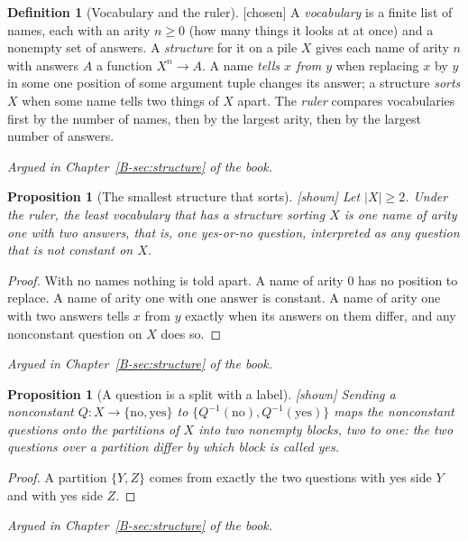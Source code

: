 \documentclass[11pt, a4paper]{article}
\theoremstyle{plain}
\newtheorem{proposition}[theorem]{Proposition}
\theoremstyle{definition}
\newtheorem{definition}[theorem]{Definition}
\theoremstyle{remark}
\newcommand{\Bool}{\{\mathrm{no},\mathrm{yes}\}}
\newcommand{\inv}{^{-1}}
\newcommand{\argued}[1]{\par\noindent\textit{Argued in Chapter~\ref{B-#1} of the book.}\par}
\newcommand{\kind}[1]{\textup{[#1]}}
\begin{document}
\begin{definition}[Vocabulary and the ruler]\label{spec:ruler} \kind{chosen}
A \emph{vocabulary} is a finite list of names, each with an arity $n\ge 0$ (how many things it looks at at
once) and a nonempty set of answers. A \emph{structure} for it on a pile $X$ gives each name of arity $n$
with answers $A$ a function $X^n\to A$. A name \emph{tells $x$ from $y$} when replacing $x$ by $y$ in some one
position of some argument tuple changes its answer; a structure \emph{sorts} $X$ when some name tells two
things of $X$ apart. The \emph{ruler} compares vocabularies first by the number of names, then by the largest
arity, then by the largest number of answers.
\end{definition}
\argued{sec:structure}

\begin{proposition}[The smallest structure that sorts]\label{spec:one-question} \kind{shown}
Let $|X|\ge2$. Under the ruler, the least vocabulary that has a structure sorting $X$ is one name of arity
one with two answers, that is, one yes-or-no question, interpreted as any question that is not constant on
$X$.
\end{proposition}
\begin{proof}
With no names nothing is told apart. A name of arity $0$ has no position to replace. A name of arity one with
one answer is constant. A name of arity one with two answers tells $x$ from $y$ exactly when its answers on
them differ, and any nonconstant question on $X$ does so.
\end{proof}
\argued{sec:structure}

\begin{proposition}[A question is a split with a label]\label{spec:question-split} \kind{shown}
Sending a nonconstant $Q:X\to\Bool$ to $\{Q\inv(\mathrm{no}),Q\inv(\mathrm{yes})\}$ maps the nonconstant
questions onto the partitions of $X$ into two nonempty blocks, two to one: the two questions over a partition
differ by which block is called yes.
\end{proposition}
\begin{proof}
A partition $\{Y,Z\}$ comes from exactly the two questions with yes side $Y$ and with yes side $Z$.
\end{proof}
\argued{sec:structure}
\end{document}
